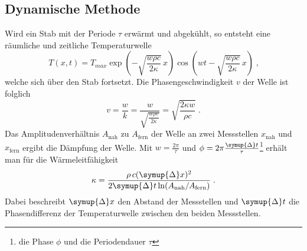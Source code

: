 \subsection{Dynamische Methode}
\label{sec:dyM}
Wird ein Stab mit der Periode $\tau$ erwärmt und abgekühlt, so entsteht eine räumliche und zeitliche Temperaturwelle
\begin{equation}
    T(x,t)=T_{max} \exp \left({-\sqrt{\frac{w \rho c}{2 \kappa}}}\, x \right)\cos \left( wt-\sqrt{\frac{w \rho c}{2 \kappa}}\, x\right)\; \text{,}
\end{equation}
welche sich über den Stab fortsetzt. Die Phasengeschwindigkeit $v$ der Welle ist folglich
\begin{equation}
    v=\frac{w}{k}=\frac{w}{\sqrt{\frac{w \rho c}{2 \kappa}}}=\sqrt{\frac{2\kappa w}{\rho c}}\; \text{.}
\end{equation}
Das Amplitudenverhältnis $A_\text{nah}$ zu $A_\text{fern}$ der Welle an zwei Messstellen $x_\text{nah}$ und $x_\text{fern}$ ergibt die Dämpfung der Welle.
Mit $w=\frac{2\pi}{\tau}$ und $\phi=2\pi \frac{\symup{\Delta}t}{\tau}$\footnote{die Phase $\phi$ und die Periodendauer $\tau$} erhält man für die Wärmeleitfähigkeit
\begin{equation}
    \kappa=\frac{\rho\, c (\symup{\Delta}x)^2}{2\symup{\Delta}t \ln (A_\text{nah}/A_\text{fern})}\; \text{.}
\end{equation}
Dabei beschreibt $\symup{\Delta}x$ den Abstand der Messstellen und $\symup{\Delta}t$ die Phasendifferenz der Temperaturwelle zwischen den beiden Messstellen.

